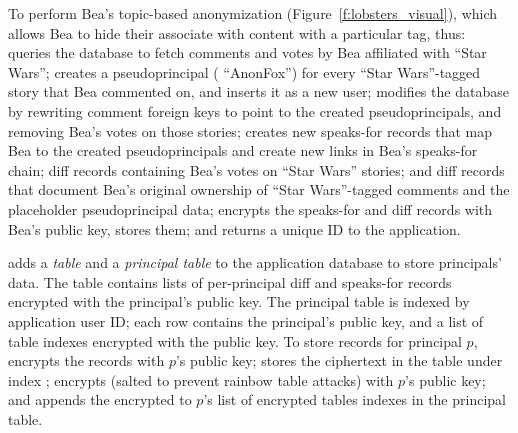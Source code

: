 %
To perform Bea's topic-based anonymization (Figure~\ref{f:lobsters_visual}),
which allows Bea to hide their associate with content with a particular tag,
%
\sys thus:
%
\one{} queries the database to fetch comments and votes by Bea
affiliated with ``Star Wars'';
%
\two{} creates a pseudoprincipal (\eg
``AnonFox'') for every ``Star Wars''-tagged story that Bea commented
on, and inserts it as a new user;
%
\three{} modifies the database by rewriting comment
foreign keys to point to the created pseudoprincipals, and
removing Bea's votes on those stories;
%
\four{} creates new speaks-for records that map Bea to the created
pseudoprincipals and create new links in Bea's speaks-for chain; diff records
containing Bea's votes on ``Star Wars'' stories; and diff records that document
Bea's original ownership of ``Star Wars''-tagged comments and the placeholder
pseudoprincipal data;
%
\five{} encrypts the speaks-for and diff records with Bea's public key, stores
them; and
%
\six{} returns a unique \xx ID to the application.

%
%
%

\sys adds a \emph{\xx table} and a \emph{principal table} to the application
database to store principals' \xxed data.
%
The \xx table contains lists of per-principal diff and speaks-for records encrypted with the
principal's public key.
%
%
The principal table is indexed by application user ID; each row contains the
principal's public key, and a list of \xx table indexes encrypted with the
public key.
%
To store records for principal $p$, \sys \one{} encrypts the records with
$p$'s public key; \two{} stores the ciphertext in the \xx table under index
; \three{} encrypts  (salted to
prevent rainbow table attacks) with $p$'s public key; and \four{} appends the
encrypted  to $p$'s list of encrypted \xx tables indexes
in the principal table.

